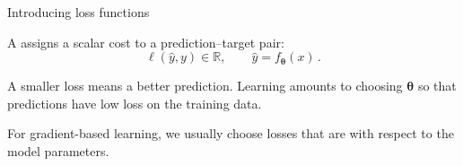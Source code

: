 \documentclass[12pt,aspectratio=169]{beamer}
\begin{document}
\begin{frame}{Introducing loss functions}

	\begin{tcolorbox}[nndsblue]
		A  assigns a scalar cost to a prediction--target pair:
		\begin{equation}
			\ell\left(\hat{y}, y\right) \in \mathbb{R},
			\qquad \hat{y} = f_{\boldsymbol{\theta}}(x) \,.
		\end{equation}
	\end{tcolorbox}

	A smaller loss means a better prediction. Learning amounts to choosing $\boldsymbol{\theta}$ so that predictions have low loss on the training data.

	\begin{tcolorbox}[nndsgreen,boxsep=1mm,top=1mm,bottom=1mm]
		For gradient-based learning, we usually choose losses that are  with respect to the model parameters.
	\end{tcolorbox}
	
\end{frame}
\end{document}
